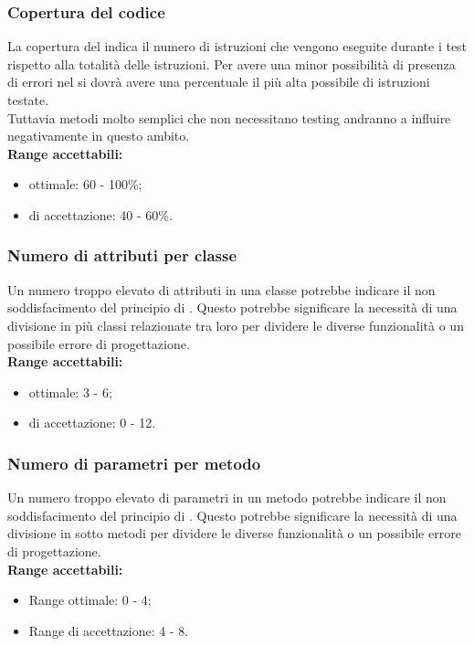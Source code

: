 \documentclass{scalatekids-article}
\begin{document}
\subsubsection{Copertura del codice}
La copertura del  indica il numero di istruzioni che vengono eseguite durante i test rispetto alla totalità delle istruzioni. Per avere una minor possibilità di presenza di errori nel  si dovrà avere una percentuale il più alta possibile di istruzioni testate.\\Tuttavia metodi molto semplici che non necessitano testing andranno a influire negativamente in questo ambito.\\
\textbf{Range accettabili:}
\begin{itemize}
  \item {} ottimale: 60 - 100\%;
  \item {} di accettazione: 40 - 60\%.
\end{itemize}
\subsubsection{Numero di attributi per classe}
Un numero troppo elevato di attributi in una classe potrebbe indicare il non soddisfacimento del principio di \textit{}. Questo potrebbe significare la necessità di una divisione in più classi relazionate tra loro per dividere le diverse funzionalità o un possibile errore di progettazione.\\
\textbf{Range accettabili:}
\begin{itemize}
  \item {} ottimale: 3 - 6;
  \item {} di accettazione: 0 - 12.
\end{itemize}
\subsubsection{Numero di parametri per metodo}
Un numero troppo elevato di parametri in un metodo potrebbe indicare il non soddisfacimento del principio di \textit{}. Questo potrebbe significare la necessità di una divisione in sotto metodi per dividere le diverse funzionalità o un possibile errore di progettazione.\\
\textbf{Range accettabili:}
\begin{itemize}
  \item Range ottimale: 0 - 4;
  \item Range di accettazione: 4 - 8.
\end{itemize}
\end{document}
